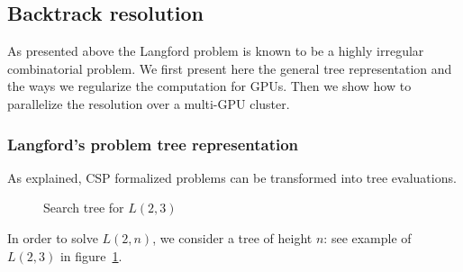 %
%
%
%
%

\subsection{Backtrack resolution}

As presented above the Langford problem is known to be a highly irregular combinatorial problem. 
We first present here the general tree representation and the ways we regularize the computation for GPUs.
Then we show how to parallelize the resolution over a multi-GPU cluster.

\subsubsection{Langford's problem tree representation}
\label{sec:LGF_resolution}
As explained, CSP formalized problems can be transformed into tree evaluations. %
\begin{figure}[t!]
\centering

\caption{Search tree for $L(2,3)$}
\label{fig:arbre}
\end{figure}
In order to solve $L(2,n)$, we consider a tree of height $n$: see example of $L(2,3)$ in figure~\ref{fig:arbre}.

